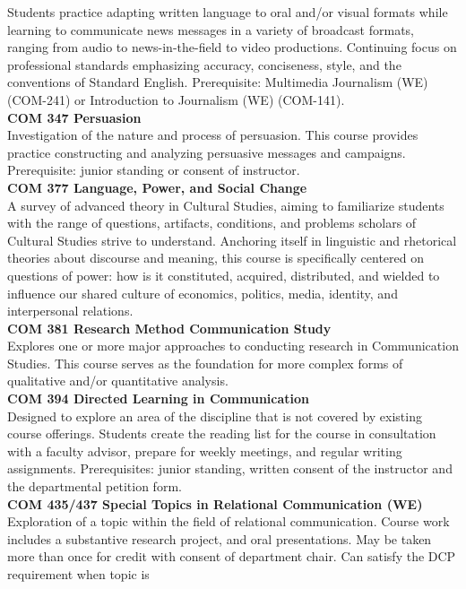 \documentclass[
  letterpaper,
]{scrbook}
\begin{document}
Students practice adapting written language to oral and/or visual
formats while learning to communicate news messages in a variety of
broadcast formats, ranging from audio to news-in-the-field to video
productions. Continuing focus on professional standards emphasizing
accuracy, conciseness, style, and the conventions of Standard English.
Prerequisite: Multimedia Journalism (WE) (COM-241) or Introduction to
Journalism (WE) (COM-141).\\
\textbf{COM 347 Persuasion}\\
Investigation of the nature and process of persuasion. This course
provides practice constructing and analyzing persuasive messages and
campaigns. Prerequisite: junior standing or consent of instructor.\\
\textbf{COM 377 Language, Power, and Social Change}\\
A survey of advanced theory in Cultural Studies, aiming to familiarize
students with the range of questions, artifacts, conditions, and
problems scholars of Cultural Studies strive to understand. Anchoring
itself in linguistic and rhetorical theories about discourse and
meaning, this course is specifically centered on questions of power: how
is it constituted, acquired, distributed, and wielded to influence our
shared culture of economics, politics, media, identity, and
interpersonal relations.\\
\textbf{COM 381 Research Method Communication Study}\\
Explores one or more major approaches to conducting research in
Communication Studies. This course serves as the foundation for more
complex forms of qualitative and/or quantitative analysis.\\
\textbf{COM 394 Directed Learning in Communication}\\
Designed to explore an area of the discipline that is not covered by
existing course offerings. Students create the reading list for the
course in consultation with a faculty advisor, prepare for weekly
meetings, and regular writing assignments. Prerequisites: junior
standing, written consent of the instructor and the departmental
petition form.\\
\textbf{COM 435/437 Special Topics in Relational Communication (WE)}\\
Exploration of a topic within the field of relational communication.
Course work includes a substantive research project, and oral
presentations. May be taken more than once for credit with consent of
department chair. Can satisfy the DCP requirement when topic is
\end{document}
